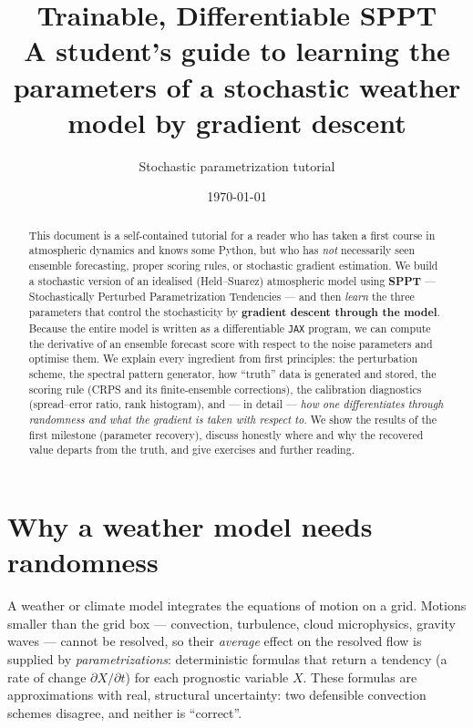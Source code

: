 \documentclass[11pt]{article}
\title{\textbf{Trainable, Differentiable SPPT}\\[4pt]
\large A student's guide to learning the parameters of a stochastic weather model
by gradient descent}
\author{Stochastic parametrization tutorial \\ \code{examples/stochastic\_sppt/}}
\date{\today}
\newcommand{\code}[1]{\texttt{#1}}
\begin{document}
\maketitle

\begin{abstract}
\noindent
This document is a self-contained tutorial for a reader who has taken a first
course in atmospheric dynamics and knows some Python, but who has \emph{not}
necessarily seen ensemble forecasting, proper scoring rules, or stochastic
gradient estimation. We build a stochastic version of an idealised
(Held--Suarez) atmospheric model using \textbf{SPPT} --- Stochastically
Perturbed Parametrization Tendencies --- and then \emph{learn} the three
parameters that control the stochasticity by \textbf{gradient descent through the
model}. Because the entire model is written as a differentiable \code{JAX}
program, we can compute the derivative of an ensemble forecast score with respect
to the noise parameters and optimise them. We explain every ingredient from
first principles: the perturbation scheme, the spectral pattern generator, how
``truth'' data is generated and stored, the scoring rule (CRPS and its
finite-ensemble corrections), the calibration diagnostics (spread--error ratio,
rank histogram), and --- in detail --- \emph{how one differentiates through
randomness and what the gradient is taken with respect to}. We show the results
of the first milestone (parameter recovery), discuss honestly where and why the
recovered value departs from the truth, and give exercises and further reading.
\end{abstract}

\tableofcontents

\section{Why a weather model needs randomness}

A weather or climate model integrates the equations of motion on a grid. Motions
smaller than the grid box --- convection, turbulence, cloud microphysics, gravity
waves --- cannot be resolved, so their \emph{average} effect on the resolved flow
is supplied by \emph{parametrizations}: deterministic formulas that return a
tendency (a rate of change $\partial X/\partial t$) for each prognostic variable
$X$. These formulas are approximations with real, structural uncertainty: two
defensible convection schemes disagree, and neither is ``correct''.
\end{document}

